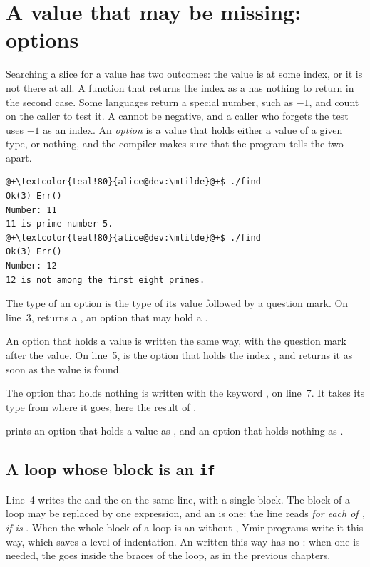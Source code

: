\vfill\pagebreak
\section{A value that may be missing: options}
\label{sec:collections:options}

Searching a slice for a value has two outcomes: the value is at some index, or
it is not there at all. A function that returns the index as a 
has nothing to return in the second case. Some languages return a special
number, such as $-1$, and count on the caller to test it. A  cannot
be negative, and a caller who forgets the test uses $-1$ as an index. An
\textit{option} is a value that holds either a value of a given type, or nothing,
and the compiler makes sure that the program tells the two apart.


\vspace{-10pt}%
\begin{lstlisting}[style=bashVerb, escapechar=@+]
@+\textcolor{teal!80}{alice@dev:\mtilde}@+$ ./find
Ok(3) Err()
Number: 11
11 is prime number 5.
@+\textcolor{teal!80}{alice@dev:\mtilde}@+$ ./find
Ok(3) Err()
Number: 12
12 is not among the first eight primes.
\end{lstlisting}

The type of an option is the type of its value followed by a question mark.
On line~3,  returns a , an option that may hold a
.

An option that holds a value is written the same way, with the question mark
after the value. On line~5,  is the option that holds the index
, and  returns it as soon as the value is found.

The option that holds nothing is written with the keyword , on
line~7. It takes its type from where it goes, here the result of
.

 prints an option that holds a value as , and an
option that holds nothing as .

\subsection{A loop whose block is an \texttt{if}}

Line~4 writes the  and the  on the same line, with a
single block. The block of a loop may be replaced by one expression, and an
 is one: the line reads \textit{for each  of
, if  is }. When the whole block of a
loop is an  without , Ymir programs write it this way,
which saves a level of indentation. An  written this way has no
: when one is needed, the  goes inside the braces of the
loop, as in the previous chapters.

